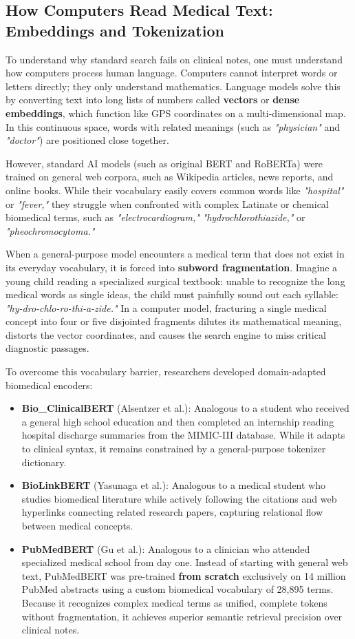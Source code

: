 \documentclass[11pt, a4paper]{article}
\begin{document}
\subsection{How Computers Read Medical Text: Embeddings and Tokenization}
To understand why standard search fails on clinical notes, one must understand how computers process human language. Computers cannot interpret words or letters directly; they only understand mathematics. Language models solve this by converting text into long lists of numbers called \textbf{vectors} or \textbf{dense embeddings}, which function like GPS coordinates on a multi-dimensional map. In this continuous space, words with related meanings (such as \textit{"physician"} and \textit{"doctor"}) are positioned close together.

However, standard AI models (such as original BERT and RoBERTa) were trained on general web corpora, such as Wikipedia articles, news reports, and online books. While their vocabulary easily covers common words like \textit{"hospital"} or \textit{"fever,"} they struggle when confronted with complex Latinate or chemical biomedical terms, such as \textit{"electrocardiogram,"} \textit{"hydrochlorothiazide,"} or \textit{"pheochromocytoma."}

When a general-purpose model encounters a medical term that does not exist in its everyday vocabulary, it is forced into \textbf{subword fragmentation}. Imagine a young child reading a specialized surgical textbook: unable to recognize the long medical words as single ideas, the child must painfully sound out each syllable: \textit{"hy-dro-chlo-ro-thi-a-zide."} In a computer model, fracturing a single medical concept into four or five disjointed fragments dilutes its mathematical meaning, distorts the vector coordinates, and causes the search engine to miss critical diagnostic passages.

To overcome this vocabulary barrier, researchers developed domain-adapted biomedical encoders:
\begin{itemize}
  \item \textbf{Bio\_ClinicalBERT} (Alsentzer et al.): Analogous to a student who received a general high school education and then completed an internship reading hospital discharge summaries from the MIMIC-III database. While it adapts to clinical syntax, it remains constrained by a general-purpose tokenizer dictionary.
  \item \textbf{BioLinkBERT} (Yasunaga et al.): Analogous to a medical student who studies biomedical literature while actively following the citations and web hyperlinks connecting related research papers, capturing relational flow between medical concepts.
  \item \textbf{PubMedBERT} (Gu et al.): Analogous to a clinician who attended specialized medical school from day one. Instead of starting with general web text, PubMedBERT was pre-trained \textbf{from scratch} exclusively on 14 million PubMed abstracts using a custom biomedical vocabulary of 28,895 terms. Because it recognizes complex medical terms as unified, complete tokens without fragmentation, it achieves superior semantic retrieval precision over clinical notes.
\end{itemize}
\end{document}
